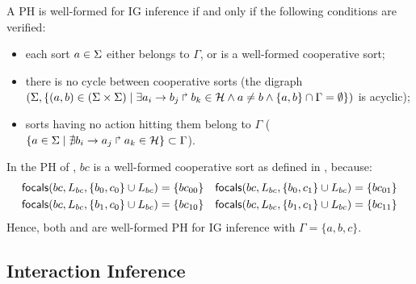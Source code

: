 \begin{property}\label{pro:wf-ph}
A PH is well-formed for IG inference if and only if the following conditions are verified:
\begin{itemize}
\item 
each sort $a\in\Sigma$ either belongs to $\Gamma$, or is a well-formed cooperative sort;
\item 
there is no cycle between cooperative sorts
(the digraph $(\Sigma,\{(a,b)\in(\Sigma\times\Sigma)\mid \exists a_i\rightarrow b_j\Rsh b_k\in\mathcal{H}
\wedge a\neq b\wedge \{a,b\}\cap\Gamma=\emptyset \})$ is
acyclic);
\item 
sorts having no action hitting them belong to $\Gamma$
($\{ a \in \Sigma\mid \nexists b_i\rightarrow a_j\Rsh a_k\in\mathcal{H}\} \subset \Gamma$).
\end{itemize}
\end{property}

\begin{example}
In the PH of , $bc$ is a well-formed cooperative sort as defined in , because:
\begin{align*}
\mathsf{focals}(bc, L_{bc}, \{b_0, c_0\} \cup L_{bc}) = \{bc_{00}\} && \mathsf{focals}(bc, L_{bc}, \{b_0, c_1\} \cup L_{bc}) = \{bc_{01}\} \\
\mathsf{focals}(bc, L_{bc}, \{b_1, c_0\} \cup L_{bc}) = \{bc_{10}\} && \mathsf{focals}(bc, L_{bc}, \{b_1, c_1\} \cup L_{bc}) = \{bc_{11}\}
\end{align*}
Hence, both  and  are well-formed PH for IG inference
with $\Gamma = \{a,b,c\}$.
\end{example}



\subsection{Interaction Inference}\label{ssec:infer-IG}



